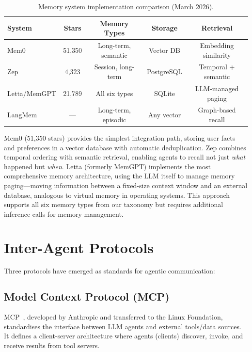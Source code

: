 \documentclass[12pt, a4paper]{article}
\begin{document}
\begin{table}[ht]
\centering
\caption{Memory system implementation comparison (March 2026).}
\label{tab:memory-impl}
\begin{tabular}{lcccc}
\toprule
\textbf{System} & \textbf{Stars} & \textbf{Memory Types} & \textbf{Storage} & \textbf{Retrieval} \\
\midrule
Mem0         & 51,350 & Long-term, semantic  & Vector DB  & Embedding similarity \\
Zep          & 4,323  & Session, long-term   & PostgreSQL & Temporal + semantic \\
Letta/MemGPT & 21,789 & All six types        & SQLite     & LLM-managed paging \\
LangMem      & ---    & Long-term, episodic  & Any vector & Graph-based recall \\
\bottomrule
\end{tabular}
\end{table}

Mem0 (51,350 stars) provides the simplest integration path, storing user facts and preferences in a vector database with automatic deduplication. Zep combines temporal ordering with semantic retrieval, enabling agents to recall not just \emph{what} happened but \emph{when}. Letta (formerly MemGPT) implements the most comprehensive memory architecture, using the LLM itself to manage memory paging---moving information between a fixed-size context window and an external database, analogous to virtual memory in operating systems. This approach supports all six memory types from our taxonomy but requires additional inference calls for memory management.

\section{Inter-Agent Protocols}\label{sec:protocols}

Three protocols have emerged as standards for agentic communication:

\subsection{Model Context Protocol (MCP)}
MCP~\citep{anthropic2024mcp}, developed by Anthropic and transferred to the Linux Foundation, standardises the interface between LLM agents and external tools/data sources. It defines a client-server architecture where agents (clients) discover, invoke, and receive results from tool servers.
\end{document}
